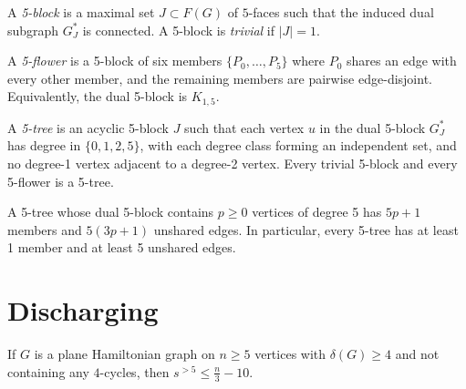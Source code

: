\begin{definition}[5-block]
  \label{def:five_block}
  \notready
  A \emph{5-block} is a maximal set $J \subset F(G)$ of $5$-faces such that
  the induced dual subgraph $G^*_J$ is connected. A 5-block is
  \emph{trivial} if $|J| = 1$.
\end{definition}

\begin{definition}[5-flower]
  \label{def:five_flower}
  \notready
  A \emph{5-flower} is a 5-block of six members $\{P_0, \ldots, P_5\}$ where
  $P_0$ shares an edge with every other member, and the remaining members are
  pairwise edge-disjoint. Equivalently, the dual 5-block is $K_{1,5}$.
\end{definition}

\begin{definition}[5-tree]
  \label{def:five_tree}
  \notready
  A \emph{5-tree} is an acyclic 5-block $J$ such that each vertex $u$ in
  the dual 5-block $G^*_J$ has degree in $\{0, 1, 2, 5\}$, with each degree
  class forming an independent set, and no degree-1 vertex adjacent to a
  degree-2 vertex. Every trivial 5-block and every 5-flower is a 5-tree.
\end{definition}

\begin{lemma}
  \label{lem:five_tree_count}
  \notready
  A 5-tree whose dual 5-block contains $p \ge 0$ vertices of degree 5
  has $5p+1$ members and $5(3p+1)$ unshared edges. In particular, every
  5-tree has at least 1 member and at least 5 unshared edges.
\end{lemma}

\section{Discharging}

\begin{lemma}
  \label{lem:discharging}
  \notready
  If $G$ is a plane Hamiltonian graph on $n \ge 5$ vertices with
  $\delta(G) \ge 4$ and not containing any $4$-cycles, then
  $s^{>5} \le \frac{n}{3} - 10$.
\end{lemma}

